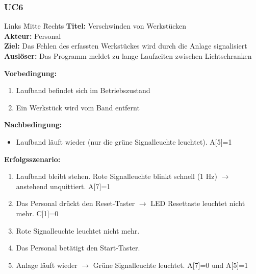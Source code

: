 \documentclass[oneside,a4paper,titlepage]{scrartcl} %
\begin{document}
\subsubsection{UC6}
\begin{tabbing}
 Links \= Mitte \= Rechts \kill
 \textbf{Titel:} \> \> Verschwinden von Werkstücken\\
 \textbf{Akteur:} \> \> Personal\\
 \textbf{Ziel:} \> \> Das Fehlen des erfassten Werkstückes wird durch die Anlage signalisiert\\
 \textbf{Auslöser:} \> \> Das Programm meldet zu lange Laufzeiten zwischen Lichtschranken\\
\end{tabbing}
\textbf{Vorbedingung:}
\begin{enumerate}
 \item Laufband befindet sich im Betriebszustand
 \item Ein Werkstück wird vom Band entfernt
\end{enumerate}
\textbf{Nachbedingung:}
\begin{itemize}
 \item Laufband läuft wieder (nur die grüne Signalleuchte leuchtet). A[5]=1
\end{itemize}
\textbf{Erfolgsszenario:}
\begin{enumerate}
 \item Laufband bleibt stehen. Rote Signalleuchte blinkt schnell (1 Hz) $\rightarrow$ anstehend unquittiert. A[7]=1
 \item Das Personal drückt den Reset-Taster $\rightarrow$ LED Resettaste leuchtet nicht mehr. C[1]=0
 \item Rote Signalleuchte leuchtet nicht mehr.
 \item Das Personal betätigt den Start-Taster.
 \item Anlage läuft wieder $\rightarrow$ Grüne Signalleuchte leuchtet. A[7]=0 und A[5]=1
\end{enumerate}

\newpage
\end{document}
